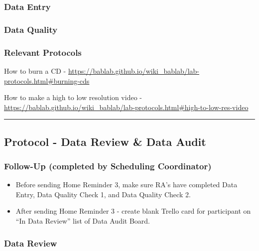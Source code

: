 \documentclass[]{book}
\providecommand{\tightlist}{%
  \setlength{\itemsep}{0pt}\setlength{\parskip}{0pt}}
\begin{document}
\hypertarget{data-entry-3}{%
\subsubsection{Data Entry}\label{data-entry-3}}

\hypertarget{data-quality-2}{%
\subsubsection{Data Quality}\label{data-quality-2}}

\hypertarget{relevant-protocols}{%
\subsubsection{Relevant Protocols}\label{relevant-protocols}}

How to burn a CD - \url{https://bablab.github.io/wiki_bablab/lab-protocols.html\#burning-cds}

How to make a high to low resolution video - \url{https://bablab.github.io/wiki_bablab/lab-protocols.html\#high-to-low-res-video}

\begin{center}\rule{0.5\linewidth}{0.5pt}\end{center}

\hypertarget{protocol---data-review-data-audit}{%
\subsection{Protocol - Data Review \& Data Audit}\label{protocol---data-review-data-audit}}

\hypertarget{follow-up-completed-by-scheduling-coordinator-1}{%
\subsubsection{Follow-Up (completed by Scheduling Coordinator)}\label{follow-up-completed-by-scheduling-coordinator-1}}

\begin{itemize}
\tightlist
\item
  Before sending Home Reminder 3, make sure RA's have completed Data Entry, Data Quality Check 1, and Data Quality Check 2.
\item
  After sending Home Reminder 3 - create blank Trello card for participant on ``In Data Review'' list of Data Audit Board.
\end{itemize}

\hypertarget{data-review}{%
\subsubsection{Data Review}\label{data-review}}
\end{document}
